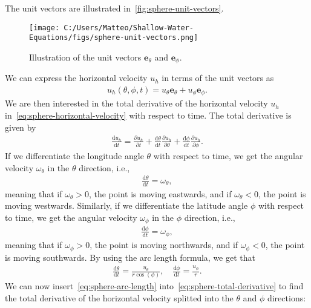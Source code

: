 The unit vectors are illustrated in~\autoref{fig:sphere-unit-vectors}.
\begin{figure}[H]
    \centering
    \texttt{[image: C:/Users/Matteo/Shallow-Water-Equations/figs/sphere-unit-vectors.png]}
    \caption{Illustration of the unit vectors $\mathbf{e}_\theta$ and $\mathbf{e}_\phi$.}\label{fig:sphere-unit-vectors}
\end{figure}
We can express the horizontal velocity $u_h$ in terms of the unit vectors as
\begin{align}\label{eq:sphere-horizontal-velocity}
    u_h(\theta, \phi, t) = u_\theta \mathbf{e}_\theta + u_\phi \mathbf{e}_\phi.
\end{align}
We are then interested in the total derivative of the horizontal velocity $u_h$ in~\eqref{eq:sphere-horizontal-velocity} with respect to time.
The total derivative is given by
\begin{align}\label{eq:sphere-total-derivative}
    \frac{\text{d}u_h}{\text{d}t} = \frac{\partial u_h}{\partial t} + \frac{\text{d}\theta}{\text{d}t} \frac{\partial u_h}{\partial \theta} + \frac{\text{d}\phi}{\text{d}t} \frac{\partial u_h}{\partial \phi}.
\end{align}
If we differentiate the longitude angle $\theta$ with respect to time, we get the angular velocity $\omega_\theta$ in the $\theta$ direction, i.e.,
\begin{align*}
    \frac{\text{d}\theta}{\text{d}t} = \omega_\theta,
\end{align*}
meaning that if $\omega_\theta > 0$, the point is moving eastwards, and if $\omega_\theta < 0$, the point is moving westwards.
Similarly, if we differentiate the latitude angle $\phi$ with respect to time, we get the angular velocity $\omega_\phi$ in the $\phi$ direction, i.e.,
\begin{align*}
    \frac{\text{d}\phi}{\text{d}t} = \omega_\phi,
\end{align*}
meaning that if $\omega_\phi > 0$, the point is moving northwards, and if $\omega_\phi < 0$, the point is moving southwards.
By using the arc length formula, we get that 
\begin{align}\label{eq:sphere-arc-length}
    \frac{\text{d}\theta}{\text{d}t} =  \frac{u_\theta}{r \cos(\phi)},
    \quad \frac{\text{d}\phi}{\text{d}t} = \frac{u_\phi}{r}.
\end{align}
We can now insert~\eqref{eq:sphere-arc-length} into~\eqref{eq:sphere-total-derivative} to find the total derivative of the horizontal velocity splitted into the $\theta$ and $\phi$ directions:
